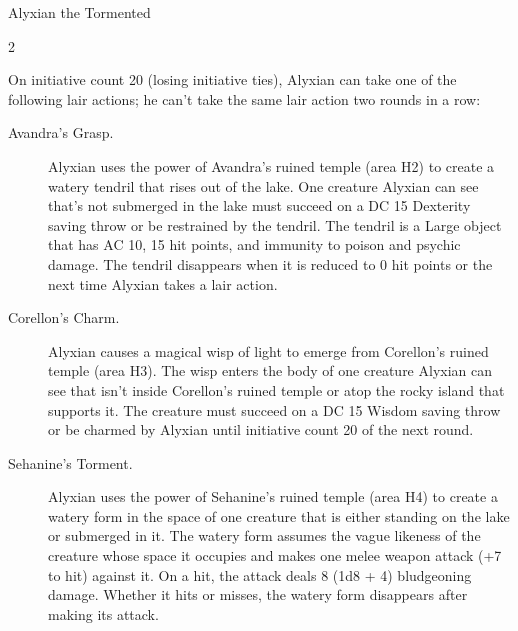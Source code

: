 \documentclass[10pt,a4paper,twoside,fancy,bg=print,twocolumn,openany,nodeprecatedcode]{dndbook}
\begin{document}
\begin{DndMonster}[float*=b,width=\textwidth + 8pt]{Alyxian the Tormented}
\begin{multicols}{2}
\begin{DndMonsterLegendaryActions}
\end{DndMonsterLegendaryActions}
On initiative count 20 (losing initiative ties), Alyxian can take one of the following lair actions; he can't take the same lair action two rounds in a row:


\begin{description}
\item[Avandra's Grasp.]
Alyxian uses the power of Avandra's ruined temple (area H2) to create a watery tendril that rises out of the lake. One creature Alyxian can see that's not submerged in the lake must succeed on a DC 15 Dexterity saving throw or be restrained by the tendril. The tendril is a Large object that has AC 10, 15 hit points, and immunity to poison and psychic damage. The tendril disappears when it is reduced to 0 hit points or the next time Alyxian takes a lair action.

\item[Corellon's Charm.]
Alyxian causes a magical wisp of light to emerge from Corellon's ruined temple (area H3). The wisp enters the body of one creature Alyxian can see that isn't inside Corellon's ruined temple or atop the rocky island that supports it. The creature must succeed on a DC 15 Wisdom saving throw or be charmed by Alyxian until initiative count 20 of the next round.

\item[Sehanine's Torment.]
Alyxian uses the power of Sehanine's ruined temple (area H4) to create a watery form in the space of one creature that is either standing on the lake or submerged in it. The watery form assumes the vague likeness of the creature whose space it occupies and makes one melee weapon attack (+7 to hit) against it. On a hit, the attack deals 8 (1d8 + 4) bludgeoning damage. Whether it hits or misses, the watery form disappears after making its attack.


\end{description}
\end{multicols}
\end{DndMonster}
\end{document}
